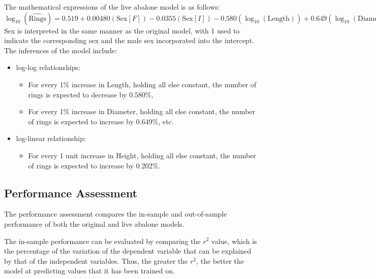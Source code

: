 \documentclass[a4paper,9pt,twocolumn,twoside,]{pinp}
\providecommand{\tightlist}{%
  \setlength{\itemsep}{0pt}\setlength{\parskip}{0pt}}
\begin{document}
The mathematical expressions of the live abalone model is as follows:\\

\(\log_{10}(\widehat{\text{Rings}}) = 0.519 + 0.00480(\text{Sex}[F]) - 0.0355(\text{Sex}[I]) -0.580(\log_{10}(\text{Length})) + 0.649(\log_{10}(\text{Diameter})) + 0.00202(\text{Height}) + 0.163(\log_{10}(\text{Whole Weight}))\)\\

Sex is interpreted in the same manner as the original model, with 1 used
to indicate the corresponding sex and the male sex incorporated into the
intercept. The inferences of the model include:

\begin{itemize}
\tightlist
\item
  log-log relationships:

  \begin{itemize}
  \tightlist
  \item
    For every 1\% increase in Length, holding all else constant, the
    number of rings is expected to decrease by 0.580\%,
  \item
    For every 1\% increase in Diameter, holding all else constant, the
    number of rings is expected to increase by 0.649\%, etc.
  \end{itemize}
\item
  log-linear relationship:

  \begin{itemize}
  \tightlist
  \item
    For every 1 unit increase in Height, holding all else constant, the
    number of rings is expected to increase by 0.202\%.
  \end{itemize}
\end{itemize}

\hypertarget{performance-assessment}{%
\subsection{Performance Assessment}\label{performance-assessment}}

The performance assessment compares the in-sample and out-of-sample
performance of both the original and live abalone models.

The in-sample performance can be evaluated by comparing the \(r^2\)
value, which is the percentage of the variation of the dependent
variable that can be explained by that of the independent variables.
Thus, the greater the \(r^2\), the better the model at predicting values
that it has been trained on.
\end{document}
